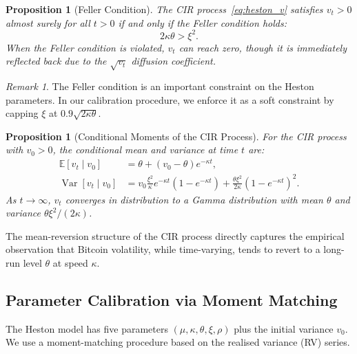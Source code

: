 \documentclass[12pt, a4paper, oneside]{report}
\theoremstyle{plain}
\newtheorem{proposition}[theorem]{Proposition}
\theoremstyle{definition}
\theoremstyle{remark}
\newtheorem{remark}[theorem]{Remark}
\newcommand{\E}{\mathbb{E}}
\newcommand{\Var}{\operatorname{Var}}
\begin{document}
\begin{proposition}[Feller Condition]
\label{prop:feller}
The CIR process~\eqref{eq:heston_v} satisfies $v_t > 0$ almost surely for all
$t > 0$ if and only if the Feller condition holds:
\[
  2\kappa\theta > \xi^2.
\]
When the Feller condition is violated, $v_t$ can reach zero, though it is
immediately reflected back due to the $\sqrt{v_t}$ diffusion coefficient.
\end{proposition}

\begin{remark}
The Feller condition is an important constraint on the Heston parameters.
In our calibration procedure, we enforce it as a soft constraint by capping
$\xi$ at $0.9\sqrt{2\kappa\theta}$.
\end{remark}

\begin{proposition}[Conditional Moments of the CIR Process]
\label{prop:cir_moments}
For the CIR process with $v_0 > 0$, the conditional mean and variance at time $t$ are:
\begin{align}
  \E[v_t \mid v_0] &= \theta + (v_0 - \theta)e^{-\kappa t}, \\
  \Var[v_t \mid v_0] &= v_0\frac{\xi^2}{\kappa}e^{-\kappa t}(1 - e^{-\kappa t})
    + \frac{\theta\xi^2}{2\kappa}(1 - e^{-\kappa t})^2.
\end{align}
As $t \to \infty$, $v_t$ converges in distribution to a Gamma distribution with
mean $\theta$ and variance $\theta\xi^2/(2\kappa)$.
\end{proposition}

The mean-reversion structure of the CIR process directly captures the empirical
observation that Bitcoin volatility, while time-varying, tends to revert to a
long-run level $\theta$ at speed $\kappa$.

\subsection{Parameter Calibration via Moment Matching}

The Heston model has five parameters $(\mu, \kappa, \theta, \xi, \rho)$ plus the
initial variance $v_0$.  We use a moment-matching procedure based on the realised
variance (RV) series.
\end{document}
